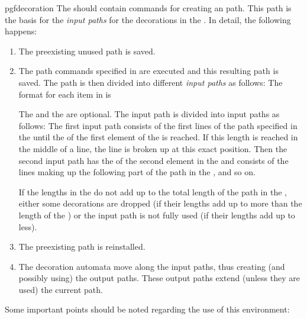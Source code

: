 \begin{environment}{{pgfdecoration}}
  The  should contain commands for creating
  an path. This path is the basis for the \emph{input paths}
  for the decorations in the . In detail, the
  following happens: 
  \begin{enumerate}
  \item
    The preexisting unused path is saved.
  \item 
    The path commands specified in  are
    executed and this resulting path is saved. The path is then
    divided into different \emph{input paths} as follows:
    The format for each item in  is 
    \begin{quote}
    \end{quote}
    The  and the  are optional. The
    input path is divided into input paths as follows: The first input
    path consists of the first lines of the path specified in the
     until the   of the first
    element of the  is reached. If this length
    is reached in the middle of a line, the line is broken up at this
    exact position. Then the second input path has the 
    of the second element in the  and consists
    of the lines making up the following  part of the
    path in the , and so on.

    If the lengths in the 
    do not add up to the total length of the path in the
    , either some  decorations are dropped
    (if their lengths add up to more than the length of the
    ) or
    the input path is not fully used (if their lengths  add up to less).
  \item
    The preexisting path is reinstalled.
  \item
    The decoration automata move along the input paths, thus creating
    (and  possibly using) the output paths. These output paths extend
    (unless they are used) the current path.
  \end{enumerate}
	 
  Some important points should be noted regarding the use of this
  environment:
  

\end{environment}
